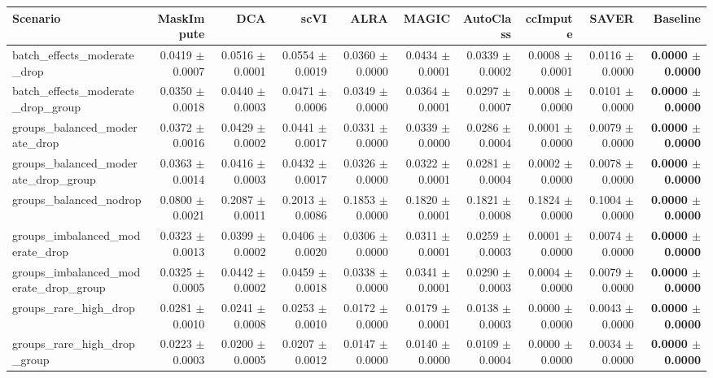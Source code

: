 \begin{tabular}{@{}lrrrrrrrrr@{}}
\toprule
Scenario & MaskImpute & DCA & scVI & ALRA & MAGIC & AutoClass & ccImpute & SAVER & Baseline \\
\midrule
batch\_effects\_moderate\_drop & 0.0419 $\pm$ 0.0007 & 0.0516 $\pm$ 0.0001 & 0.0554 $\pm$ 0.0019 & 0.0360 $\pm$ 0.0000 & 0.0434 $\pm$ 0.0001 & 0.0339 $\pm$ 0.0002 & 0.0008 $\pm$ 0.0001 & 0.0116 $\pm$ 0.0000 & \textbf{0.0000 $\pm$ 0.0000} \\
batch\_effects\_moderate\_drop\_group & 0.0350 $\pm$ 0.0018 & 0.0440 $\pm$ 0.0003 & 0.0471 $\pm$ 0.0006 & 0.0349 $\pm$ 0.0000 & 0.0364 $\pm$ 0.0001 & 0.0297 $\pm$ 0.0007 & 0.0008 $\pm$ 0.0000 & 0.0101 $\pm$ 0.0000 & \textbf{0.0000 $\pm$ 0.0000} \\
groups\_balanced\_moderate\_drop & 0.0372 $\pm$ 0.0016 & 0.0429 $\pm$ 0.0002 & 0.0441 $\pm$ 0.0017 & 0.0331 $\pm$ 0.0000 & 0.0339 $\pm$ 0.0000 & 0.0286 $\pm$ 0.0004 & 0.0001 $\pm$ 0.0000 & 0.0079 $\pm$ 0.0000 & \textbf{0.0000 $\pm$ 0.0000} \\
groups\_balanced\_moderate\_drop\_group & 0.0363 $\pm$ 0.0014 & 0.0416 $\pm$ 0.0003 & 0.0432 $\pm$ 0.0017 & 0.0326 $\pm$ 0.0000 & 0.0322 $\pm$ 0.0001 & 0.0281 $\pm$ 0.0004 & 0.0002 $\pm$ 0.0000 & 0.0078 $\pm$ 0.0000 & \textbf{0.0000 $\pm$ 0.0000} \\
groups\_balanced\_nodrop & 0.0800 $\pm$ 0.0021 & 0.2087 $\pm$ 0.0011 & 0.2013 $\pm$ 0.0086 & 0.1853 $\pm$ 0.0000 & 0.1820 $\pm$ 0.0001 & 0.1821 $\pm$ 0.0008 & 0.1824 $\pm$ 0.0000 & 0.1004 $\pm$ 0.0000 & \textbf{0.0000 $\pm$ 0.0000} \\
groups\_imbalanced\_moderate\_drop & 0.0323 $\pm$ 0.0013 & 0.0399 $\pm$ 0.0002 & 0.0406 $\pm$ 0.0020 & 0.0306 $\pm$ 0.0000 & 0.0311 $\pm$ 0.0001 & 0.0259 $\pm$ 0.0003 & 0.0001 $\pm$ 0.0000 & 0.0074 $\pm$ 0.0000 & \textbf{0.0000 $\pm$ 0.0000} \\
groups\_imbalanced\_moderate\_drop\_group & 0.0325 $\pm$ 0.0005 & 0.0442 $\pm$ 0.0002 & 0.0459 $\pm$ 0.0018 & 0.0338 $\pm$ 0.0000 & 0.0341 $\pm$ 0.0001 & 0.0290 $\pm$ 0.0003 & 0.0004 $\pm$ 0.0000 & 0.0079 $\pm$ 0.0000 & \textbf{0.0000 $\pm$ 0.0000} \\
groups\_rare\_high\_drop & 0.0281 $\pm$ 0.0010 & 0.0241 $\pm$ 0.0008 & 0.0253 $\pm$ 0.0010 & 0.0172 $\pm$ 0.0000 & 0.0179 $\pm$ 0.0001 & 0.0138 $\pm$ 0.0003 & 0.0000 $\pm$ 0.0000 & 0.0043 $\pm$ 0.0000 & \textbf{0.0000 $\pm$ 0.0000} \\
groups\_rare\_high\_drop\_group & 0.0223 $\pm$ 0.0003 & 0.0200 $\pm$ 0.0005 & 0.0207 $\pm$ 0.0012 & 0.0147 $\pm$ 0.0000 & 0.0140 $\pm$ 0.0000 & 0.0109 $\pm$ 0.0004 & 0.0000 $\pm$ 0.0000 & 0.0034 $\pm$ 0.0000 & \textbf{0.0000 $\pm$ 0.0000} \\

\end{tabular}
